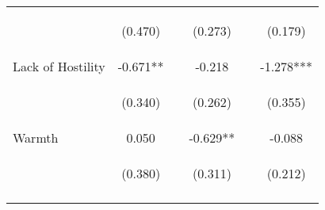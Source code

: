 \begin{tabular}{lccccc}
 & \begin{footnotesize}(0.470)\end{footnotesize} & \begin{footnotesize}\end{footnotesize} & \begin{footnotesize}(0.273)\end{footnotesize} & \begin{footnotesize}\end{footnotesize} & \begin{footnotesize}(0.179)\end{footnotesize}\\
\noalign{\smallskip}Lack of Hostility & -0.671** &  & -0.218 &  & -1.278***\\
 & \begin{footnotesize}(0.340)\end{footnotesize} & \begin{footnotesize}\end{footnotesize} & \begin{footnotesize}(0.262)\end{footnotesize} & \begin{footnotesize}\end{footnotesize} & \begin{footnotesize}(0.355)\end{footnotesize}\\
\noalign{\smallskip}Warmth & 0.050 &  & -0.629** &  & -0.088\\
 & \begin{footnotesize}(0.380)\end{footnotesize} & \begin{footnotesize}\end{footnotesize} & \begin{footnotesize}(0.311)\end{footnotesize} & \begin{footnotesize}\end{footnotesize} & \begin{footnotesize}(0.212)\end{footnotesize}\\
\noalign{\smallskip}\hline\end{tabular}\\
